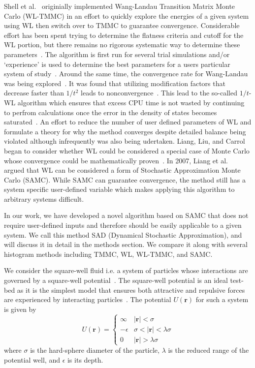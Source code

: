 \documentclass[letterpaper,twocolumn,amsmath,amssymb,pre,aps,10pt]{revtex4-1}
\begin{document}
Shell et al.~\cite{shell2003improved, shell2004flat} originially
implemented Wang-Landau Transition Matrix Monte Carlo (WL-TMMC) in an
effort to quickly explore the energies of a given system using WL then
switch over to TMMC to guarantee convergence. Considerable effort has
been spent trying to determine the flatness criteria and cutoff for the
WL portion, but there remains no rigorous systematic way to determine
these parameters~\cite{rane2013monte}.  The algorithm is first run for
several trial simulations and/or `experience' is used to determine the
best parameters for a users particular system of
study~\cite{siderius2013use}.  Around the same time, the convergence
rate for Wang-Landau was being explored~\cite{zhou2005understanding}.
It was found that utilizing modification factors that decrease faster
than $1/t^2$ leads to nonconvergence~\cite{belardinelli2007fast}.  This
lead to the so-called $1/t$-WL algorithm which ensures that excess CPU
time is not wasted by continuing to perfrom calculations once the error
in the density of states becomes
saturated~\cite{belardinelli2008analysis}. An effort to reduce the
number of user defined parameters of WL and formulate a theory for why
the method converges despite detailed balance being violated although
infrequently was also being udertaken.  Liang, Liu, and Carrol began to
consider whether WL could be considered a special case of Monte Carlo
whose convergence could be mathematically
proven~\cite{liang2006theory, liang2007stochastic}. In 2007, Liang et
al.~\cite{liang2007stochastic} argued that WL can be considered a form
of Stochastic Approximation Monte Carlo (SAMC).  While SAMC can
guarantee convergence, the method still has a system specific
user-defined variable which makes applying this algorithm to arbitrary
systems difficult.

In our work, we have developed a novel algorithm based on SAMC that
does not require user-defined inputs and therefore should be easily
applicable to a given system.  We call this method SAD (Dynamical
Stochastic Approximation), and will discuss it in detail in the methods
section. We compare it along with several histogram methods including TMMC,
WL, WL-TMMC, and SAMC.

We consider the square-well fluid i.e. a system of particles whose
interactions are governed by a square-well
potential~\cite{singh2003surface, barker2004perturbationSW}.  The
square-well potential is an ideal test-bed as it is the simplest model
that ensures both attractive and repulsive forces are experienced by
interacting particles~\cite{barker1967-SW-perturbation, vega1992phase}.
The potential $U(\textbf{r})$ for such a system is given by
\begin{equation}
 U(\textbf{r})=\begin{cases} \infty &
 \lvert\textbf{r}\rvert< \sigma\\-\epsilon &
 \sigma<\lvert\textbf{r}\rvert<\lambda\sigma\\0 &
 \lvert\textbf{r}\rvert > \lambda\sigma\end{cases}
\end{equation}
where $\sigma$ is the hard-sphere diameter of the particle, $\lambda$ is the
reduced range of the potential well, and $\epsilon$ is its depth.
\end{document}
